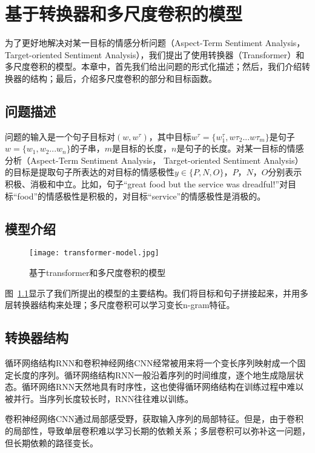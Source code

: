 \chapter{基于转换器和多尺度卷积的模型}
\label{cha:transformer}

为了更好地解决对某一目标的情感分析问题（Aspect-Term Sentiment Analysis， Target-oriented Sentiment Analysis），我们提出了使用转换器（Transformer）和多尺度卷积的模型。本章中，首先我们给出问题的形式化描述；然后，我们介绍转换器的结构；最后，介绍多尺度卷积的部分和目标函数。

\section{问题描述}

问题的输入是一个句子目标对$(w,w^\tau)$，其中目标$w^\tau=\{w^\tau_1,w\tau_2...w\tau_m\}$是句子$w=\{w_1,w_2...w_n\}$的子串，$m$是目标的长度，$n$是句子的长度。对某一目标的情感分析（Aspect-Term Sentiment Analysis， Target-oriented Sentiment Analysis）的目标是提取句子所表达的对目标的情感极性$y\in \{P, N, O\}$，$P$，$N$，$O$分别表示积极、消极和中立。比如，句子“great food but the service was dreadful!”对目标“food”的情感极性是积极的，对目标“service”的情感极性是消极的。

\section{模型介绍}

\begin{figure}[ht]
    \centering  
    \texttt{[image: transformer-model.jpg]}
    \caption{基于transformer和多尺度卷积的模型}
    \label{fig:transformer-model}
\end{figure}

图~\ref{fig:transformer-model}显示了我们所提出的模型的主要结构。我们将目标和句子拼接起来，并用多层转换器结构来处理；多尺度卷积可以学习变长n-gram特征。

\section{转换器结构}

循环网络结构RNN和卷积神经网络CNN经常被用来将一个变长序列映射成一个固定长度的序列。循环网络结构RNN一般沿着序列的时间维度，逐个地生成隐层状态。循环网络RNN天然地具有时序性，这也使得循环网络结构在训练过程中难以被并行。当序列长度较长时，RNN往往难以训练。

卷积神经网络CNN通过局部感受野，获取输入序列的局部特征。但是，由于卷积的局部性，导致单层卷积难以学习长期的依赖关系；多层卷积可以弥补这一问题，但长期依赖的路径变长。

